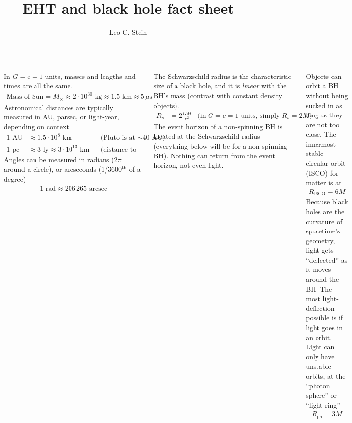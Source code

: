 \documentclass[25pt, a0paper, landscape]{tikzposter}
\title{EHT and black hole fact sheet}
\author{Leo C. Stein}
\begin{document}
\maketitle

\linespread{1.25}

\begin{columns}
    {
      In $G=c=1$ units, masses and lengths and times are all the same.
      \begin{align*}
        \text{Mass of Sun} = M_{\odot} \approx 2\cdot 10^{30} \text{ kg}
        \approx 1.5 \text{ km} \approx 5 \, \mu\text{s}
      \end{align*}
      Astronomical distances are typically measured in AU, parsec, or
      light-year, depending on context
      \begin{align*}
        1 \text{ AU} &\approx 1.5\cdot 10^8 \text{ km} && \text{(Pluto is at $\sim$40 AU)} \\
        1 \text{ pc} &\approx 3 \text{ ly} \approx 3\cdot 10^{13}\text{ km}	&&	\text{(distance to Alpha Cen is 1.3 pc)}
      \end{align*}
      Angles can be measured in radians ($2\pi$ around a circle), or
      arcseconds (1/3600$^{\text{th}}$ of a degree)
      \begin{align*}
        1 \text{ rad} \approx 206\,265 \text{ arcsec}
      \end{align*}

    }
    {\setlength{\parskip}{1cm plus 4mm minus 3mm}

      The Schwarzschild radius is the characteristic size of a black
      hole, and it is \emph{linear} with the BH’s mass (contrast with
      constant density objects).
        \begin{align*}
          R_{s} &= 2\frac{GM}{c^{2}} & \text{(in $G=c=1$ units, simply $R_s = 2M$)}
        \end{align*}
      The event horizon of a non-spinning BH is located at the
      Schwarzschild radius (everything below will be for a
      non-spinning BH). Nothing can return from the event horizon, not
      even light.

      Objects can orbit a BH without being sucked in as long as they
      are not too close. The innermost stable circular orbit (ISCO)
      for matter is at
      \begin{align*}
        R_{\text{ISCO}} = 6M
      \end{align*}
      Because black holes are the curvature of spacetime’s geometry,
      light gets ``deflected'' as it moves around the BH. The most
      light-deflection possible is if light goes in an orbit. Light
      can only have unstable orbits, at the ``photon sphere'' or
      ``light ring''
      \begin{align*}
        R_{\text{ph}} = 3M
      \end{align*}

}
\end{columns}
\end{document}

